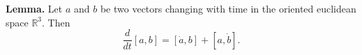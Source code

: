 \textbf{Lemma.} Let $a$ and $b$ be two vectors changing with time in the oriented euclidean space $\mathbb{R}^3$. Then
$$\frac{d}{dt} [a, b] = [\dot{a}, b] + [a, \dot{b}].$$
